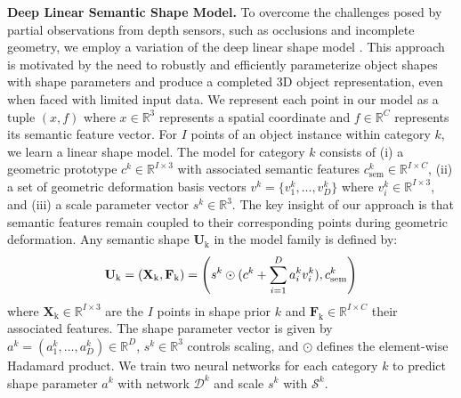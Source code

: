 \noindent\textbf{Deep Linear Semantic Shape Model.}  
To overcome the challenges posed by partial observations from depth sensors, such as occlusions and incomplete geometry, we employ a variation of the deep linear shape model \cite{loiseau2021representing}. This approach is motivated by the need to robustly and efficiently parameterize object shapes with shape parameters and produce a completed 3D object representation, even when faced with limited input data. We represent each point in our model as a tuple $(x, f)$ where $x \in \mathbb{R}^3$ represents a spatial coordinate and $f \in \mathbb{R}^C$ represents its semantic feature vector. For $I$ points of an object instance within category $k$, we learn a linear shape model. The model for category $k$ consists of (i) a geometric prototype ${c}^k \in \mathbb{R}^{I \times 3}$ with associated semantic features ${c}^{k}_{\text{sem}} \in \mathbb{R}^{I \times C}$, (ii) a set of geometric deformation basis vectors ${v}^k = \{{v}_1^k, \ldots, v_D^k\}$ where ${v}_i^k \in \mathbb{R}^{I \times 3}$, and (iii) a scale parameter vector ${s^k} \in \mathbb{R}^3$.
The key insight of our approach is that semantic features remain coupled to their corresponding points during geometric deformation. Any semantic shape $\mathbf{U}_{\text{k}}$ in the model family is defined by:
\begin{equation}
\vspace{-0.1cm}
\mathbf{U}_{\text{k}} = (\mathbf{X}_{\text{k}}, \mathbf{F}_{\text{k}})
= \left( s^k \odot (c^k + \sum_{i=1}^D a^k_i v^k_{i}), c^k_{\text{sem}} \right)
\vspace{-0.0cm}
\label{equ:dls_familiy}
\end{equation}
where $\mathbf{X}_{\text{k}} \in \mathbb{R}^{I \times 3}$ are the $I$ points in shape prior $k$ and $\mathbf{F}_{\text{k}} \in \mathbb{R}^{I \times C}$ their associated features.
The shape parameter vector is given by ${a^k} = \left(a^k_1, \ldots, a^k_D\right) \in \mathbb{R}^D$, ${s^k} \in \mathbb{R}^3$ controls scaling, and $\odot$ defines the element-wise Hadamard product.
We train two neural networks for each category $k$ to predict shape parameter $a^k$ with network $\mathcal{D}^k$ and scale $s^k$ with $\mathcal{S}^k$.


